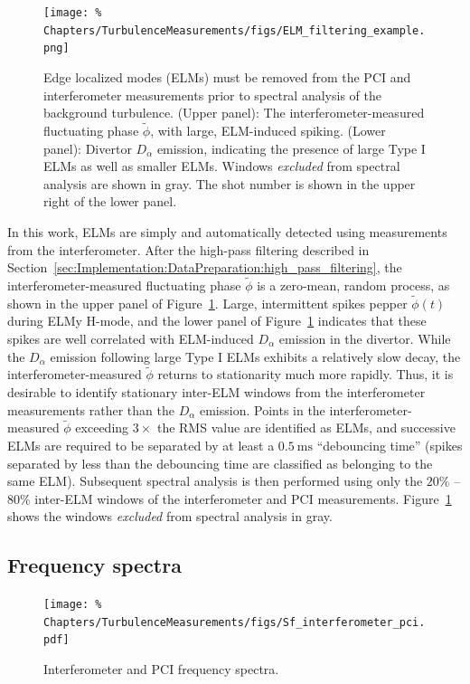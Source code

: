 \begin{figure}
  \centering
  \texttt{[image: \%
    Chapters/TurbulenceMeasurements/figs/ELM\_filtering\_example.png]}
  \caption[ELM filtering]{%
    Edge localized modes (ELMs) must be removed
    from the PCI and interferometer measurements
    prior to spectral analysis of the background turbulence.
    (Upper panel): The interferometer-measured
    fluctuating phase $\tilde{\phi}$,
    with large, ELM-induced spiking.
    (Lower panel): Divertor $D_{\alpha}$ emission,
    indicating the presence of large Type I ELMs
    as well as smaller ELMs.
    Windows \emph{excluded} from spectral analysis are shown in gray.
    The \diiid\space shot number is shown in the upper right
    of the lower panel.
  }
\label{fig:TurbulenceMeasurements:ELM_filtering_example}
\end{figure}

In this work, ELMs are simply and automatically detected
using measurements from the interferometer.
After the high-pass filtering described in
Section~\ref{sec:Implementation:DataPreparation:high_pass_filtering},
the interferometer-measured fluctuating phase $\tilde{\phi}$
is a zero-mean, random process,
as shown in the upper panel of
Figure~\ref{fig:TurbulenceMeasurements:ELM_filtering_example}.
Large, intermittent spikes pepper $\tilde{\phi}(t)$ during ELMy H-mode, and
the lower panel of
Figure~\ref{fig:TurbulenceMeasurements:ELM_filtering_example}
indicates that these spikes are well correlated
with ELM-induced $D_{\alpha}$ emission in the divertor.
While the $D_{\alpha}$ emission following large Type I ELMs
exhibits a relatively slow decay,
the interferometer-measured $\tilde{\phi}$
returns to stationarity much more rapidly.
Thus, it is desirable to identify
stationary inter-ELM windows
from the interferometer measurements
rather than the $D_{\alpha}$ emission.
Points in the interferometer-measured $\tilde{\phi}$
exceeding $3 \times$ the RMS value
are identified as ELMs, and
successive ELMs are required to be separated
by at least a $\SI{0.5}{\milli\second}$ ``debouncing time''
(spikes separated by less than the debouncing time
are classified as belonging to the same ELM).
Subsequent spectral analysis is then performed
using only the $20\%$ -- $80\%$ inter-ELM windows
of the interferometer and PCI measurements.
Figure~\ref{fig:TurbulenceMeasurements:ELM_filtering_example}
shows the windows \emph{excluded} from spectral analysis in gray.


\subsection{Frequency spectra}
\label{sec:TurbulenceMeasurements:Sf}
\begin{figure}
  \centering
  \texttt{[image: \%
    Chapters/TurbulenceMeasurements/figs/Sf\_interferometer\_pci.pdf]}
  \caption[Interferometer \& PCI frequency spectra]{%
    Interferometer and PCI frequency spectra.
  }
\label{fig:TurbulenceMeasurements:Sf_interferometer_pci}
\end{figure}

